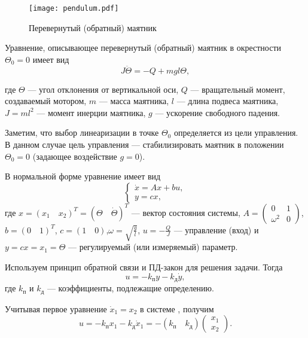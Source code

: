 \documentclass[../../TAU.tex]{subfiles}
\begin{document}
    \begin{figure}[h]
    \centering
    \texttt{[image: pendulum.pdf]}
    \caption{Перевернутый (обратный) маятник}
    \centering
    \end{figure}

    Уравнение, описывающее перевернутый (обратный) маятник в окрестности $\Theta_0=0$ имеет вид
    \begin{equation}\label{EQ1}
    J\ddot\Theta = -Q+mgl\Theta,
    \end{equation}
    {\small где $\Theta$ --- угол отклонения от вертикальной оси, $Q$ --- вращательный момент, создаваемый мотором, $m$ --- масса маятника, $l$ --- длина подвеса
    маятника, $J = ml^2$ --- момент инерции маятника, $g$ --- ускорение свободного падения.

    Заметим, что выбор линеаризации в точке $\Theta_0$ определяется из цели управления. В данном случае цель управления --- стабилизировать маятник в положении $\Theta_0 = 0$ (задающее воздействие $g = 0$).
    }

    В нормальной форме уравнение  имеет вид
    \begin{equation}\label{EQ1NORM}
    \begin{cases}
    \dot x = Ax + bu,\\
    y = c x,
    \end{cases}
    \end{equation}
    где $x = (x_1\quad x_2)^T = ( \Theta\quad \dot\Theta)^T$ --- вектор состояния системы, $A =\begin{pmatrix}0 & 1\\ \omega^2& 0\end{pmatrix}$,$b = (0\quad 1)^T$, $c = (1\quad0)$,$\omega = \sqrt{\frac{g}{l}}$, $u = -\frac{Q}{J}$ --- управление (вход) и $y = cx = x_1 = \Theta$ --- регулируемый (или измеряемый) параметр.



    Используем принцип обратной связи и ПД-закон для решения задачи. Тогда
    $$
    u = -k_\text{п} y - k_\text{д} \dot y,
    $$
    где $k_\text{п}$ и $k_\text{д}$ --- коэффициенты, подлежащие определению.

    Учитывая первое уравнение $\dot x_1 = x_2$ в системе , получим
    $$
    u = - k_\text{п} x_1 - k_\text{д} \dot x_1 = - (k_\text{п}\quad k_\text{д}) \begin{pmatrix}x_1 \\ x_2\end{pmatrix}.
    $$
\end{document}
